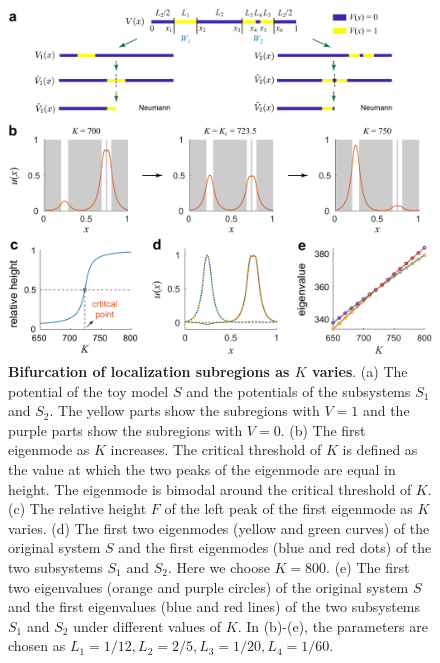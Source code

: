 \documentclass[a4paper,11pt]{article}
\begin{document}
\begin{figure}[!htb]
\centering
\includegraphics[width=\linewidth]{Fig5}
\caption{\textbf{Bifurcation of localization subregions as $K$ varies}. (a) The potential of the toy model $S$ and the potentials of the subsystems $S_1$ and $S_2$. The yellow parts show the subregions with $V = 1$ and the purple parts show the subregions with $V = 0$. (b) The first eigenmode as $K$ increases. The critical threshold of $K$ is defined as the value at which the two peaks of the eigenmode are equal in height. The eigenmode is bimodal around the critical threshold of $K$. (c) The relative height $F$ of the left peak of the first eigenmode as $K$ varies. (d) The first two eigenmodes (yellow and green curves) of the original system $S$ and the first eigenmodes (blue and red dots) of the two subsystems $S_1$ and $S_2$. Here we choose $K = 800$. (e) The first two eigenvalues (orange and purple circles) of the original system $S$ and the first eigenvalues (blue and red lines) of the two subsystems $S_1$ and $S_2$ under different values of $K$. In (b)-(e), the parameters are chosen as $L_1 = 1/12, L_2 = 2/5, L_3= 1/20, L_4 = 1/60$.}
\label{fig5}
\end{figure}
\end{document}
